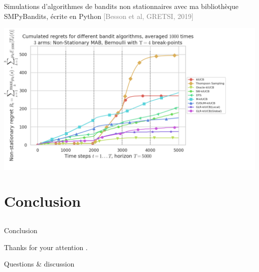 \documentclass[11pt,english,ignorenonframetext,]{beamer}
\newcommand{\Fontify}{}
\begin{document}
\begin{frame}[plain]{\normalsize Simulations d'algorithmes de bandits \alert{non stationnaires} avec ma bibliothèque SMPyBandits, écrite en Python \hfill{}\textcolor{gray}{[Besson et al, GRETSI, 2019]}}

  \centering
  \includegraphics[width=1.15\textwidth]{figures/example_regret_non_stationary_bandits.png}

\end{frame}



\section{\hfill{}Conclusion\hfill{}}
\subsection{}

\begin{frame}{Conclusion}

\begin{center}
  \begin{Large}
    {\Fontify Thanks for your attention .}
    \Smiley[0.9]
  \end{Large}
\end{center}

\begin{center}
  \begin{Large}
    Questions \& discussion
  \end{Large}
\end{center}

\end{frame}
\end{document}

